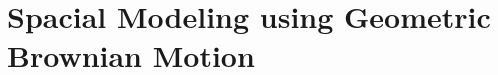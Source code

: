 
\chapter{Spacial Modeling using Geometric Brownian Motion}
\label{ch:GBM}

\begingroup
\newcommand{\score}{S}
\newcommand{\myalgo}{CoolAlgo}



%





\endgroup
